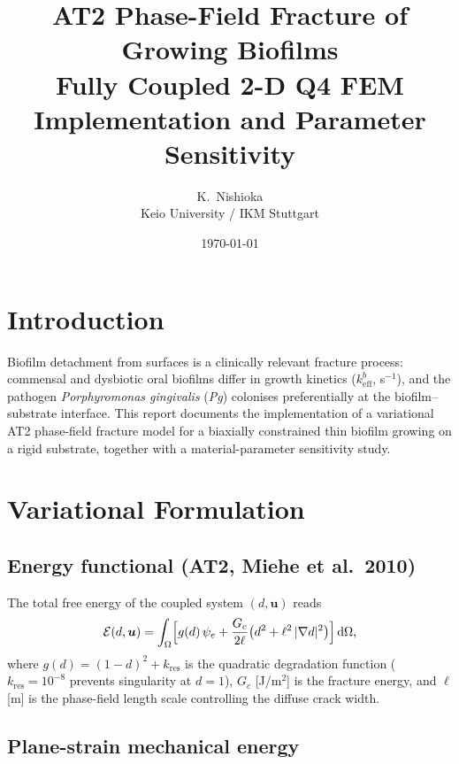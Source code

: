\documentclass[11pt, a4paper]{article}
\title{\textbf{AT2 Phase-Field Fracture of Growing Biofilms}\\[4pt]
       \large Fully Coupled 2-D Q4 FEM Implementation and Parameter Sensitivity}
\author{K.\ Nishioka \\ Keio University / IKM Stuttgart}
\date{\today}
\newcommand{\Gc}{G_c}
\newcommand{\psiE}{\psi_e}
\begin{document}
\maketitle
\tableofcontents
\bigskip

\section{Introduction}
\label{sec:intro}

Biofilm detachment from surfaces is a clinically relevant fracture process:
commensal and dysbiotic oral biofilms differ in growth kinetics
($k_{\mathrm{eff}}^{b}$, s$^{-1}$), and the pathogen
\textit{Porphyromonas gingivalis} (\textit{Pg}) colonises preferentially at the
biofilm--substrate interface.
This report documents the implementation of a variational AT2 phase-field fracture
model for a biaxially constrained thin biofilm growing on a rigid substrate,
together with a material-parameter sensitivity study.

\section{Variational Formulation}
\label{sec:theory}

\subsection{Energy functional (AT2, Miehe et al.\ 2010)}

The total free energy of the coupled system \((d, \bm{u})\) reads
\begin{equation}
  \mathcal{E}(d, \bm{u})
  = \int_\Omega \Bigl[
      g(d)\,\psiE
      + \frac{\Gc}{2\ell}\bigl(d^2 + \ell^2\,|\nabla d|^2\bigr)
    \Bigr]\,\mathrm{d}\Omega,
  \label{eq:energy}
\end{equation}
where $g(d) = (1-d)^2 + k_{\mathrm{res}}$ is the quadratic degradation function
($k_{\mathrm{res}} = 10^{-8}$ prevents singularity at $d=1$),
$\Gc$ [J/m$^2$] is the fracture energy, and $\ell$ [m] is the
phase-field length scale controlling the diffuse crack width.

\subsection{Plane-strain mechanical energy}
\end{document}
